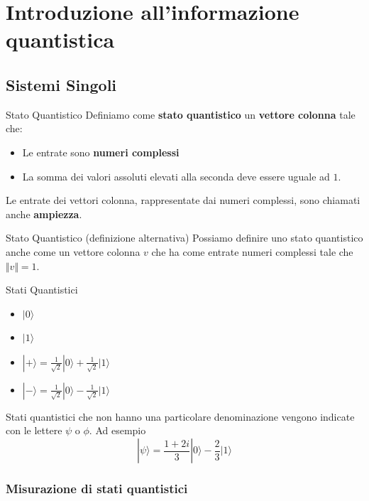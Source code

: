 \section{Introduzione all'informazione quantistica}
\subsection{Sistemi Singoli}
\begin{definition}{Stato Quantistico}{}
    Definiamo come \textbf{stato quantistico} un \textbf{vettore colonna} tale che:
    \begin{itemize}
        \item Le entrate sono \textbf{numeri complessi}
        \item La somma dei valori assoluti elevati alla seconda deve essere uguale ad $1$.
    \end{itemize}
\end{definition}
Le entrate dei vettori colonna, rappresentate dai numeri complessi, sono chiamati anche \textbf{ampiezza}.
\begin{definition}{Stato Quantistico (definizione alternativa)}{}
    Possiamo definire uno stato quantistico anche come un vettore colonna $v$ che ha come entrate numeri complessi tale che $\Vert v \Vert = 1$.
\end{definition}

\begin{example}{Stati Quantistici}{}
\begin{itemize}
    \item $|0\rangle$
    \item $|1\rangle$
    \item $|+\rangle = \frac{1}{\sqrt{2}}|0\rangle +  \frac{1}{\sqrt{2}}|1\rangle$
    \item $|-\rangle = \frac{1}{\sqrt{2}}|0\rangle -  \frac{1}{\sqrt{2}}|1\rangle$
\end{itemize}
\end{example}
Stati quantistici che non hanno una particolare denominazione vengono indicate con le lettere $\psi$ o $\phi$. Ad esempio
\begin{equation*}
    |\psi\rangle = \frac{1 + 2i}{3}|0\rangle -  \frac{2}{3}|1\rangle
\end{equation*}
\subsubsection{Misurazione di stati quantistici}
